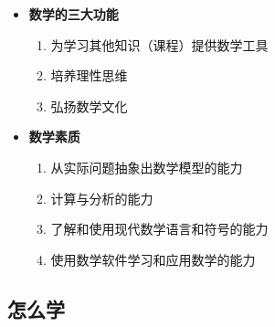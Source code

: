 \begin{itemize}
  \item {\bf 数学的三大功能}
  \begin{enumerate}
    \item 为学习其他知识（课程）提供数学工具
    \item 培养理性思维
    \item 弘扬数学文化
  \end{enumerate}
  \item {\bf 数学素质}
  \begin{enumerate}
    \item 从实际问题抽象出数学模型的能力
    \item 计算与分析的能力
    \item 了解和使用现代数学语言和符号的能力
    \item 使用数学软件学习和应用数学的能力
  \end{enumerate}
\end{itemize}

\subsection{怎么学}

